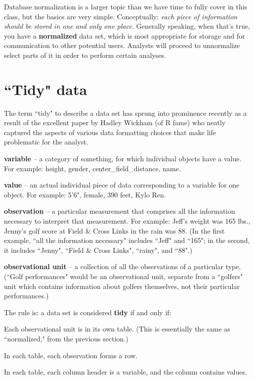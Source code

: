 \documentclass[12pt]{article}
\begin{document}
Database normalization is a larger topic than we have time to fully cover in
this class, but the basics are very simple. Conceptually: \textit{each piece
of information should be stored in one and only one place.} Generally
speaking, when that's true, you have a \textbf{normalized} data set, which is
most appropriate for storage and for communication to other potential users.
Analysts will proceed to unnormalize select parts of it in order to perform
certain analyses.

\section{``Tidy" data}

The term ``tidy" to describe a data set has sprung into prominence recently as
a result of the excellent paper by Hadley Wickham (of R fame) who neatly
captured the aspects of various data formatting choices that make life
problematic for the analyst. 

\begin{compactitem}
\item \textbf{variable} -- a category of something, for which individual
objects have a value. For example: height, gender, center\_field\_distance,
name.
\item \textbf{value} -- an actual individual piece of data corresponding to a
variable for one object. For example: 5'6", female, 390 feet, Kylo Ren.
\item \textbf{observation} -- a particular measurement that comprises all the
information necessary to interpret that measurement. For example: Jeff's
weight was 165 lbs., Jenny's golf score at Field \& Cross Links in the rain
was 88. (In the first example, ``all the information necessary" includes
``Jeff" and ``165"; in the second, it includes ``Jenny", ``Field \& Cross
Links", ``rainy", and ``88".)
\item \textbf{observational unit} -- a collection of all the observations of a
particular type. (``Golf performances" would be an observational unit,
separate from a ``golfers" unit which contains information about golfers
themselves, not their particular performances.)
\end{compactitem}

\vspace{.2in}
The rule is: a data set is considered \textbf{tidy} if and only if:
\begin{compactenum}
\item Each observational unit is in its own table. (This is essentially
the same as ``normalized," from the previous section.)
\item In each table, each observation forms a row.
\item In each table, each column header is a variable, and the column contains
values.
\end{compactenum}
\end{document}
